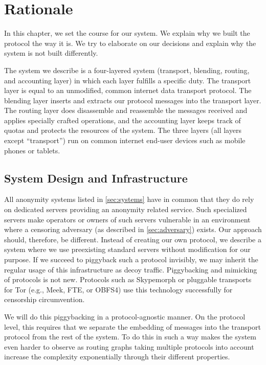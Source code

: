 \chapter{Rationale}\label{sec:rationale}
In this chapter, we set the course for our system. We explain why we built the protocol the way it is. We try to elaborate on our decisions and explain why the system is not built differently.

The system we describe is a four-layered system (transport, blending, routing, and accounting layer) in which each layer fulfills a specific duty. The transport layer is equal to an unmodified, common internet data transport protocol. The blending layer inserts and extracts our protocol messages into the transport layer. The routing layer does disassemble and reassemble the messages received and applies specially crafted operations, and the accounting layer keeps track of quotas and protects the resources of the system. The three \MessageVortex{} layers (all layers except ``transport'') run on common internet end-user devices such as mobile phones or tablets.

\section{System Design and Infrastructure}
All anonymity systems listed in \cref{sec:systems} have in common that they do rely on dedicated servers providing an anonymity related service. Such specialized servers make operators or owners of such servers vulnerable in an environment where a censoring adversary (as described in \cref{sec:adversary}) exists. Our approach should, therefore, be different. Instead of creating our own protocol, we describe a system where we use preexisting standard servers without modification for our purpose. If we succeed to piggyback such a protocol invisibly, we may inherit the regular usage of this infrastructure as decoy traffic. Piggybacking and mimicking of protocols is not new. Protocols such as Skypemorph\cite{mohajeri2012skypemorph} or pluggable transports for Tor (e.g., Meek, FTE, or OBFS4) use this technology successfully for censorship circumvention.

We will do this piggybacking in a protocol-agnostic manner. On the protocol level, this requires that we separate the embedding of messages into the transport protocol from the rest of the system. To do this in such a way makes the system even harder to observe as routing graphs taking multiple protocols into account increase the complexity exponentially through their different properties.

